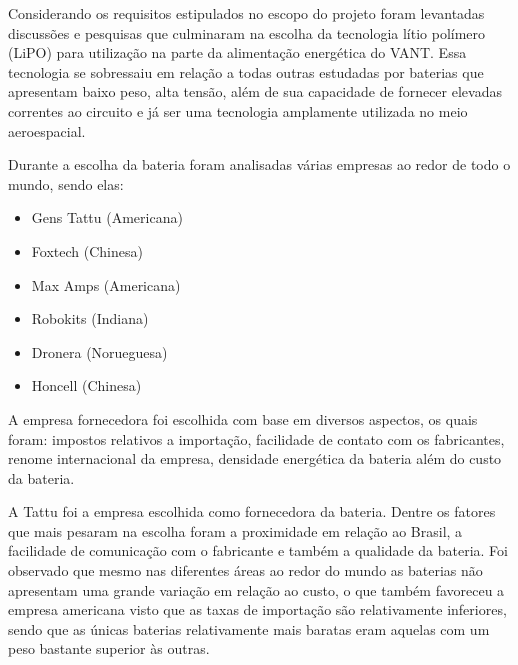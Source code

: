 
Considerando os requisitos estipulados  no escopo do projeto foram levantadas discussões e pesquisas que culminaram na escolha da tecnologia lítio polímero (LiPO) para utilização na parte da alimentação energética do VANT. Essa tecnologia se sobressaiu em relação a todas outras estudadas por baterias que apresentam baixo peso, alta tensão, além de sua capacidade de fornecer elevadas correntes ao circuito e já ser uma tecnologia amplamente utilizada no meio aeroespacial.

Durante a escolha da bateria foram analisadas várias empresas ao redor de todo o mundo, sendo elas:

\begin{itemize}
 
\item Gens Tattu (Americana)

\item Foxtech (Chinesa)

\item Max Amps (Americana)

\item Robokits (Indiana)

\item Dronera (Norueguesa)

\item Honcell (Chinesa)

\end{itemize}


A empresa fornecedora foi escolhida com base em diversos aspectos, os quais foram: impostos relativos a importação, facilidade de contato com os fabricantes, renome internacional da empresa, densidade energética da bateria além do custo da bateria.

A  Tattu foi a empresa escolhida como fornecedora da bateria.  Dentre os fatores que mais pesaram na escolha foram a proximidade em relação ao Brasil, a facilidade de comunicação com o fabricante e também a qualidade da bateria. Foi observado que mesmo nas diferentes áreas ao redor do mundo as baterias não apresentam uma grande variação em relação ao custo, o que também favoreceu a empresa americana visto que as taxas de importação são relativamente inferiores, sendo que as únicas baterias relativamente mais baratas eram aquelas com um peso bastante superior às outras.

